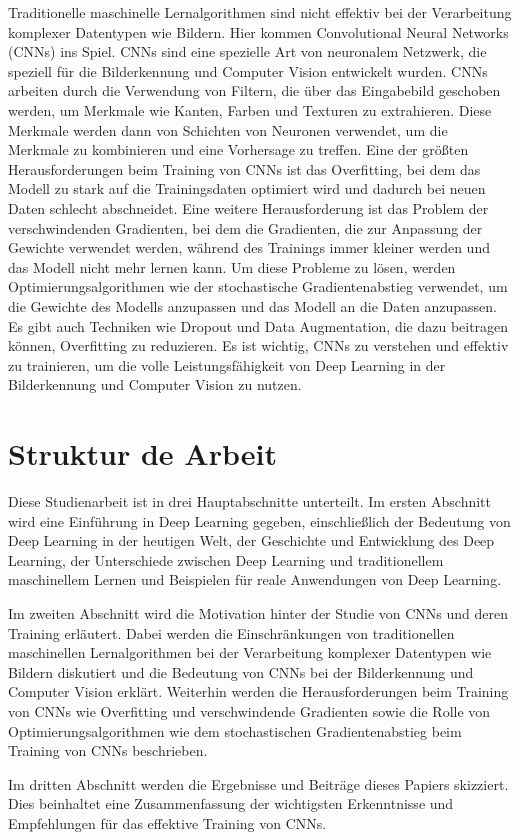     Traditionelle maschinelle Lernalgorithmen sind nicht effektiv bei der Verarbeitung komplexer Datentypen wie Bildern. Hier kommen Convolutional Neural Networks (CNNs) ins Spiel. 
    CNNs sind eine spezielle Art von neuronalem Netzwerk, die speziell für die Bilderkennung und Computer Vision entwickelt wurden. 
    CNNs arbeiten durch die Verwendung von Filtern, die über das Eingabebild geschoben werden, um Merkmale wie Kanten, Farben und Texturen zu extrahieren. 
    Diese Merkmale werden dann von Schichten von Neuronen verwendet, um die Merkmale zu kombinieren und eine Vorhersage zu treffen. 
    Eine der größten Herausforderungen beim Training von CNNs ist das Overfitting, bei dem das Modell zu stark auf die Trainingsdaten optimiert wird und dadurch bei neuen Daten schlecht abschneidet. 
    Eine weitere Herausforderung ist das Problem der verschwindenden Gradienten, bei dem die Gradienten, die zur Anpassung der Gewichte verwendet werden, während des Trainings immer kleiner werden und das Modell nicht mehr lernen kann. 
    Um diese Probleme zu lösen, werden Optimierungsalgorithmen wie der stochastische Gradientenabstieg verwendet, um die Gewichte des Modells anzupassen und das Modell an die Daten anzupassen. 
    Es gibt auch Techniken wie Dropout und Data Augmentation, die dazu beitragen können, Overfitting zu reduzieren. 
    Es ist wichtig, CNNs zu verstehen und effektiv zu trainieren, um die volle Leistungsfähigkeit von Deep Learning in der Bilderkennung und Computer Vision zu nutzen. 
    
\section{Struktur de Arbeit}

    Diese Studienarbeit ist in drei Hauptabschnitte unterteilt.
    Im ersten Abschnitt wird eine Einführung in Deep Learning gegeben, einschließlich der Bedeutung von Deep Learning in der heutigen Welt, der Geschichte und Entwicklung des Deep Learning, der Unterschiede zwischen Deep Learning und traditionellem maschinellem Lernen und Beispielen für reale Anwendungen von Deep Learning.
    
    Im zweiten Abschnitt wird die Motivation hinter der Studie von CNNs und deren Training erläutert. Dabei werden die Einschränkungen von traditionellen maschinellen Lernalgorithmen bei der Verarbeitung komplexer Datentypen wie Bildern diskutiert und die Bedeutung von CNNs bei der Bilderkennung und Computer Vision erklärt. Weiterhin werden die Herausforderungen beim Training von CNNs wie Overfitting und verschwindende Gradienten sowie die Rolle von Optimierungsalgorithmen wie dem stochastischen Gradientenabstieg beim Training von CNNs beschrieben.
    
    Im dritten Abschnitt werden die Ergebnisse und Beiträge dieses Papiers skizziert. Dies beinhaltet eine Zusammenfassung der wichtigsten Erkenntnisse und Empfehlungen für das effektive Training von CNNs.